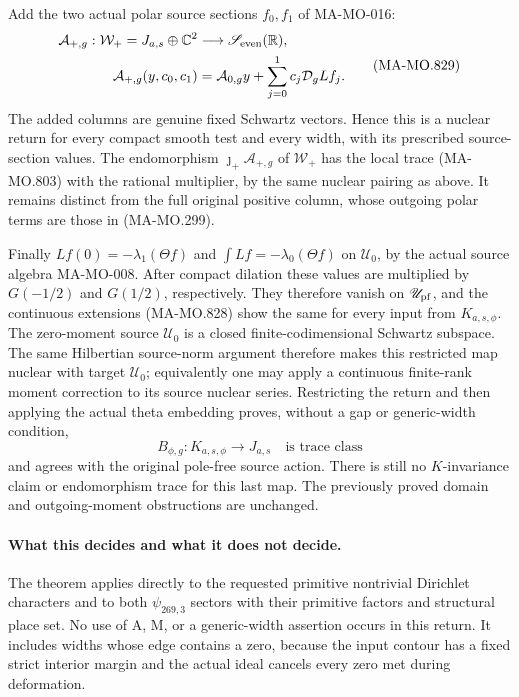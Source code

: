 Add the two actual polar source sections \(f_0,f_1\)
of MA-MO-016:
\[
 \begin{aligned}
 \mathcal A_{+,g}: \mathcal W_+=J_{a,s}\oplus\mathbb C^2
                      &\longrightarrow\mathscr S_{\rm even}(\mathbb R),\\
 \mathcal A_{+,g}(y,c_0,c_1)
       &=\mathcal A_{0,g}y+
                 \sum_{j=0}^1 c_j\mathcal D_gLf_j .
 \end{aligned}
 \tag{MA-MO.829}
\]
The added columns are genuine fixed Schwartz vectors.
Hence this is a nuclear return for every compact smooth
test and every width, with its prescribed source-section
values. The endomorphism
\(\jmath_+\mathcal A_{+,g}\) of \(\mathcal W_+\)
has the local trace (MA-MO.803) with the rational
multiplier, by the same nuclear pairing as above.
It remains distinct from the full original positive
column, whose outgoing polar terms are those in
(MA-MO.299).

Finally \(Lf(0)=-\lambda_1(\Theta f)\) and
\(\int Lf=-\lambda_0(\Theta f)\) on \(\mathscr U_0\),
by the actual source algebra MA-MO-008.
After compact dilation these values are multiplied
by \(G(-1/2)\) and \(G(1/2)\), respectively.
They therefore vanish on \(\mathscr U_{\rm pf}\),
and the continuous extensions (MA-MO.828) show the
same for every input from \(K_{a,s,\phi}\).
The zero-moment source \(\mathscr U_0\) is a closed
finite-codimensional Schwartz subspace. The same
Hilbertian source-norm argument therefore makes this
restricted map nuclear with target \(\mathscr U_0\);
equivalently one may apply a continuous finite-rank
moment correction to its source nuclear series.
Restricting the return and then applying
the actual theta embedding proves, without a gap
or generic-width condition,
\[
       B_{\phi,g}:K_{a,s,\phi}\longrightarrow J_{a,s}
                      \quad\text{is trace class}
 \tag{MA-MO.830}
\]
and agrees with the original pole-free source action.
There is still no \(K\)-invariance claim or
endomorphism trace for this last map. The previously
proved domain and outgoing-moment obstructions are
unchanged.

\paragraph{What this decides and what it does not decide.}
The theorem applies directly to the requested primitive
nontrivial Dirichlet characters and to both
\(\psi_{269,3}\) sectors with their primitive factors
and structural place set. No use of A, M, or a
generic-width assertion occurs in this return.
It includes widths whose edge contains a zero,
because the input contour has a fixed strict
interior margin and the actual ideal cancels every
zero met during deformation.

